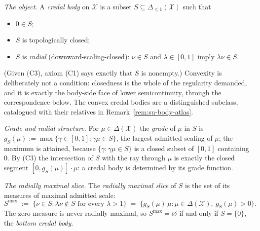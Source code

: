 \begin{definition}
\emph{The object.} A \emph{credal body} on $\mathcal{X}$ is a
subset $S \subseteq \Delta_{\le 1}(\mathcal{X})$ such that
\begin{itemize}
\item[(C1)] $0 \in S$;
\item[(C2)] $S$ is topologically closed;
\item[(C3)] $S$ is \emph{radial} (downward-scaling-closed):
  $\nu \in S$ and $\lambda \in [0,1]$ imply $\lambda\nu \in S$.
\end{itemize}
(Given (C3), axiom (C1) says exactly that $S$ is nonempty.)
Convexity is deliberately not a condition: closedness is the whole
of the regularity demanded, and it is exactly the body-side face of
lower semicontinuity, through the correspondence below. The convex
credal bodies are a distinguished subclass, catalogued with their
relatives in Remark~\ref{rem:su-body-atlas}.

\emph{Grade and radial structure.} For $\mu \in \Delta(\mathcal{X})$
the \emph{grade} of $\mu$ in $S$ is
$g_S(\mu) := \max\{\gamma \in [0,1] : \gamma\mu \in S\}$,
the largest admitted scaling of $\mu$; the maximum is attained,
because $\{\gamma : \gamma\mu \in S\}$ is a closed subset of $[0,1]$
containing $0$. By (C3) the intersection of $S$ with the
ray through $\mu$ is exactly the closed segment
$[0, g_S(\mu)] \cdot \mu$: a credal body is determined by its grade
function.

\emph{The radially maximal slice.} The \emph{radially maximal slice}
of $S$ is the set of its measures of maximal admitted scale:
\[
  S^{\max} \;:=\;
  \{\nu \in S : \lambda\nu \notin S \text{ for every } \lambda > 1\}
  \;=\;
  \{g_S(\mu)\,\mu : \mu \in \Delta(\mathcal{X}),\ g_S(\mu) > 0\}.
\]
The zero measure is never radially maximal, so
$S^{\max} = \varnothing$ if and only if $S = \{0\}$, the \emph{bottom
credal body}.
\end{definition}

